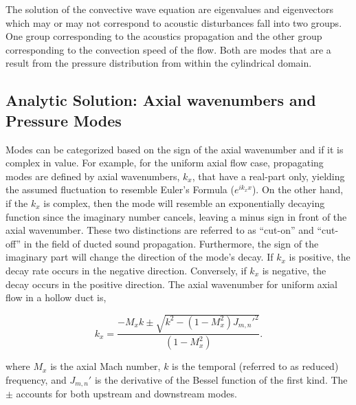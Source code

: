 \documentclass[a4paper]{report}
\begin{document}

The solution of the convective wave equation are eigenvalues and eigenvectors 
which may or may not correspond to acoustic disturbances fall into two groups.  
One group corresponding to the acoustics propagation and the other group 
corresponding to the convection speed of the flow. Both are modes that are a
result from the pressure distribution from within the cylindrical domain.  

\subsection{ Analytic Solution: Axial wavenumbers and Pressure Modes}

Modes can be categorized based on the sign of the axial wavenumber and if it is
complex in value. For example, for the uniform axial flow case, propagating modes
are defined by axial wavenumbers, $k_x$, that have a real-part only, yielding 
the assumed fluctuation to resemble Euler's Formula ($e^{ik_x x}$). On the other 
hand, if the $k_x$ is complex, then the mode will resemble an exponentially decaying
function since the imaginary number cancels, leaving a minus sign in front of
the axial wavenumber. These two distinctions are referred to as ``cut-on'' and 
``cut-off'' in the field of ducted sound propagation. Furthermore, the sign of 
the imaginary part will change the direction of the mode's decay. If $k_x$ is 
positive, the decay rate occurs in the negative direction. Conversely, if $k_x$ 
is negative, the decay occurs in the positive direction. The axial wavenumber
for uniform axial flow in a hollow duct is,

\begin{equation}
    k_x  = \frac{- M_x k \pm \sqrt{k^2 - ( 1 - M_x^2) J_{m,n}'^2 }}{\left( 1 - M_x^2 \right)}.
    \label{eqn:ax_wavenumb}
\end{equation}

where $M_x$ is the axial Mach number, $k$ is the temporal (referred to as reduced)
frequency, and $J_{m,n}'$ is the derivative of the Bessel function of the first kind.  
The $\pm$ accounts for both upstream and downstream modes.
\end{document}
